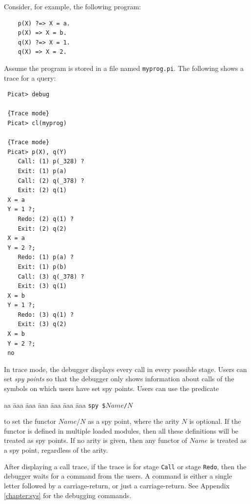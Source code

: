 Consider, for example, the following program:
\begin{verbatim}
    p(X) ?=> X = a.
    p(X) => X = b.
    q(X) ?=> X = 1.
    q(X) => X = 2.
\end{verbatim}
Assume the program is stored in a file named \texttt{myprog.pi}. The following shows a trace for a query:
\begin{verbatim}
 Picat> debug

 {Trace mode}
 Picat> cl(myprog)

 {Trace mode}
 Picat> p(X), q(Y)  
    Call: (1) p(_328) ?
    Exit: (1) p(a) 
    Call: (2) q(_378) ?
    Exit: (2) q(1) 
 X = a
 Y = 1 ?;
    Redo: (2) q(1) ?
    Exit: (2) q(2) 
 X = a
 Y = 2 ?;
    Redo: (1) p(a) ?
    Exit: (1) p(b) 
    Call: (3) q(_378) ?
    Exit: (3) q(1) 
 X = b
 Y = 1 ?;
    Redo: (3) q(1) ?
    Exit: (3) q(2) 
 X = b
 Y = 2 ?;
 no
\end{verbatim}

In trace mode, the debugger displays every call in every possible stage. Users can set \emph{spy points} so that the debugger only shows information about calls of the symbols on which users have set spy points. Users can use the predicate 
\begin{tabbing}
aa \= aaa \= aaa \= aaa \= aaa \= aaa \= aaa \kill
\> \texttt{spy \$$Name$/$N$} 
\end{tabbing}
to set the functor $Name$/$N$ as a spy point, where the arity $N$ is optional. If the functor is defined in multiple loaded modules, then all these definitions will be treated as spy points. If no arity is given, then any functor of $Name$ is treated as a spy point, regardless of the arity.

After displaying a call trace, if the trace is for stage \texttt{Call} or stage \texttt{Redo}, then the debugger waits for a command from the users. A command is either a single letter followed by a carriage-return, or just a carriage-return. See Appendix \ref{chapter:sys} for the debugging commands.


